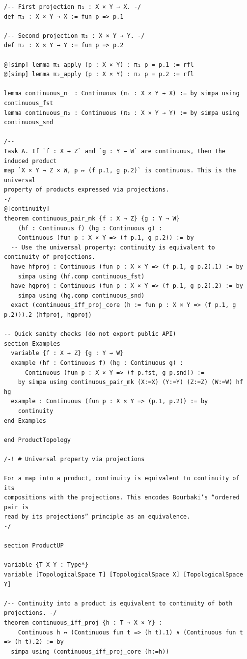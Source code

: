 \documentclass[12pt]{article}
\begin{document}
\begin{lstlisting}
/-- First projection π₁ : X × Y → X. -/
def π₁ : X × Y → X := fun p => p.1

/-- Second projection π₂ : X × Y → Y. -/
def π₂ : X × Y → Y := fun p => p.2

@[simp] lemma π₁_apply (p : X × Y) : π₁ p = p.1 := rfl
@[simp] lemma π₂_apply (p : X × Y) : π₂ p = p.2 := rfl

lemma continuous_π₁ : Continuous (π₁ : X × Y → X) := by simpa using continuous_fst
lemma continuous_π₂ : Continuous (π₂ : X × Y → Y) := by simpa using continuous_snd

/--
Task A. If `f : X → Z` and `g : Y → W` are continuous, then the induced product
map `X × Y → Z × W, p ↦ (f p.1, g p.2)` is continuous. This is the universal
property of products expressed via projections.
-/
@[continuity]
theorem continuous_pair_mk {f : X → Z} {g : Y → W}
    (hf : Continuous f) (hg : Continuous g) :
    Continuous (fun p : X × Y => (f p.1, g p.2)) := by
  -- Use the universal property: continuity is equivalent to continuity of projections.
  have hfproj : Continuous (fun p : X × Y => (f p.1, g p.2).1) := by
    simpa using (hf.comp continuous_fst)
  have hgproj : Continuous (fun p : X × Y => (f p.1, g p.2).2) := by
    simpa using (hg.comp continuous_snd)
  exact (continuous_iff_proj_core (h := fun p : X × Y => (f p.1, g p.2))).2 ⟨hfproj, hgproj⟩

-- Quick sanity checks (do not export public API)
section Examples
  variable {f : X → Z} {g : Y → W}
  example (hf : Continuous f) (hg : Continuous g) :
      Continuous (fun p : X × Y => (f p.fst, g p.snd)) :=
    by simpa using continuous_pair_mk (X:=X) (Y:=Y) (Z:=Z) (W:=W) hf hg
  example : Continuous (fun p : X × Y => (p.1, p.2)) := by
    continuity
end Examples

end ProductTopology

/-! # Universal property via projections

For a map into a product, continuity is equivalent to continuity of its
compositions with the projections. This encodes Bourbaki’s “ordered pair is
read by its projections” principle as an equivalence.
-/

section ProductUP

variable {T X Y : Type*}
variable [TopologicalSpace T] [TopologicalSpace X] [TopologicalSpace Y]

/-- Continuity into a product is equivalent to continuity of both projections. -/
theorem continuous_iff_proj {h : T → X × Y} :
    Continuous h ↔ (Continuous fun t => (h t).1) ∧ (Continuous fun t => (h t).2) := by
  simpa using (continuous_iff_proj_core (h:=h))


\end{lstlisting}
\end{document}
